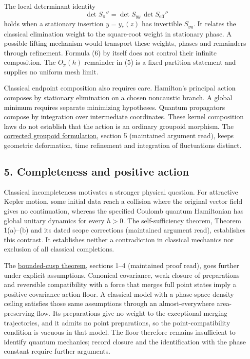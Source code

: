\documentclass[11pt,a4paper]{article}
\begin{document}
The local determinant identity \[
 \det S_\pi''=\det S_{yy}\,\det S_{\mathrm{eff}}'' \tag{6}
\] holds when a stationary insertion \(y=y_*(z)\) has invertible
\(S_{yy}\). It relates the classical elimination weight to the
square-root weight in stationary phase. A possible lifting mechanism
would transport these weights, phases and remainders through refinement.
Formula (6) by itself does not control their infinite composition. The
\(O_\pi(h)\) remainder in (5) is a fixed-partition statement and
supplies no uniform mesh limit.

Classical endpoint composition also requires care. Hamilton's principal
action composes by stationary elimination on a chosen noncaustic branch.
A global minimum requires separate minimizing hypotheses. Quantum
propagators compose by integration over intermediate coordinates. These
kernel composition laws do not establish that the action is an ordinary
groupoid morphism. The
\href{groupoid-quantum-newton-states.md}{corrected groupoid
formulation}, section 5 (maintained argument read), keeps geometric
deformation, time refinement and integration of fluctuations distinct.

\hypertarget{completeness-and-positive-action}{%
\subsection{5. Completeness and positive
action}\label{completeness-and-positive-action}}

Classical incompleteness motivates a stronger physical question. For
attractive Kepler motion, some initial data reach a collision where the
original vector field gives no continuation, whereas the specified
Coulomb quantum Hamiltonian has global unitary dynamics for every
\(h>0\). The \href{self-sufficiency-contrast.md}{self-sufficiency
theorem}, Theorem 1(a)--(b) and its dated scope corrections (maintained
argument read), establishes this contrast. It establishes neither a
contradiction in classical mechanics nor exclusion of all classical
completions.

The \href{newton-cusp-preparation-floor.md}{bounded-cusp theorem},
sections 1--4 (maintained proof read), goes further under explicit
assumptions. Canonical covariance, weak closure of preparations and
reversible compatibility with a force that merges full point states
imply a positive covariance action floor. A classical model with a
phase-space density ceiling satisfies those same assumptions through an
almost-everywhere area-preserving flow. Its preparations give no weight
to the exceptional merging trajectories, and it admits no point
preparations, so the point-compatibility condition is vacuous in that
model. The floor therefore remains insufficient to identify quantum
mechanics; record closure and the identification with the phase constant
require further arguments.
\end{document}
